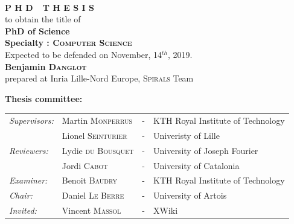 \begin{titlepage}
\begin{center}
\vspace*{0.9cm}
 \\
\vspace*{0.9cm}
\vspace*{0.5cm}
\noindent \Huge \textbf{P H D\ \ T H E S I S} \\
\vspace*{0.3cm}
\noindent \large {to obtain the title of} \\
\vspace*{0.3cm}
\noindent \LARGE \textbf{PhD of Science} \\
\vspace*{0.3cm}
\noindent \Large \textbf{Specialty : \textsc{Computer Science}}\\
\vspace*{0.4cm}
\noindent \large {Expected to be defended on November, 14$^{th}$, 2019.\\}
\noindent \LARGE \textbf{Benjamin \textsc{Danglot}} \\
\vspace*{0.9cm}
\noindent \Large prepared at Inria Lille-Nord Europe, \textsc{Spirals} Team\\
\vspace*{0.5cm}
\end{center}
\noindent \large \textbf{Thesis committee:} \\
\begin{center}
\noindent \large 
\begin{tabular}{llcl}
      \textit{Supervisors:}	& Martin \textsc{Monperrus}	& - & KTH Royal Institute of Technology \\
      & Lionel \textsc{Seinturier}	& - & Univeristy of Lille \\
      \textit{Reviewers:} & Lydie \textsc{du Bousquet} & - & University of Joseph Fourier \\
      & Jordi \textsc{Cabot} & - & University of Catalonia \\
      \textit{Examiner:} & Benoit \textsc{Baudry} & - &  KTH Royal Institute of Technology\\
      \textit{Chair:} & Daniel \textsc{Le Berre} & - & University of Artois \\
      \textit{Invited:}	&   Vincent \textsc{Massol} & - &  XWiki\\
\end{tabular}
\end{center}
\end{titlepage}
\sloppy

\titlepage
